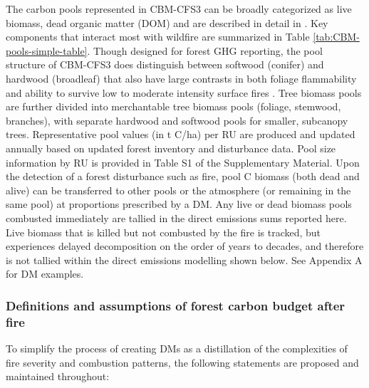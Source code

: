 \documentclass[, manuscript]{copernicus}
\begin{document}
The carbon pools represented in CBM-CFS3 can be broadly categorized as
live biomass, dead organic matter (DOM) and are described in detail in
\citet{kurzCBMCFS3ModelCarbondynamics2009}. Key components that interact
most with wildfire are summarized in Table
\ref{tab:CBM-pools-simple-table}. Though designed for forest GHG
reporting, the pool structure of CBM-CFS3 does distinguish between
softwood (conifer) and hardwood (broadleaf) that also have large
contrasts in both foliage flammability
\citep{alexanderSurfaceFireSpread2010} and ability to survive low to
moderate intensity surface fires \citep{heonResistanceBorealForest2014}.
Tree biomass pools are further divided into merchantable tree biomass
pools (foliage, stemwood, branches), with separate hardwood and softwood
pools for smaller, subcanopy trees. Representative pool values (in t
C/ha) per RU are produced and updated annually based on updated forest
inventory and disturbance data. Pool size information by RU is provided
in Table S1 of the Supplementary Material. Upon the detection of a
forest disturbance such as fire, pool C biomass (both dead and alive)
can be transferred to other pools or the atmosphere (or remaining in the
same pool) at proportions prescribed by a DM. Any live or dead biomass
pools combusted immediately are tallied in the direct emissions sums
reported here. Live biomass that is killed but not combusted by the fire
is tracked, but experiences delayed decomposition on the order of years
to decades, and therefore is not tallied within the direct emissions
modelling shown below. See Appendix A for DM examples.

\subsubsection{Definitions and assumptions of forest carbon budget after
fire}

To simplify the process of creating DMs as a distillation of the
complexities of fire severity and combustion patterns, the following
statements are proposed and maintained throughout:
\end{document}
